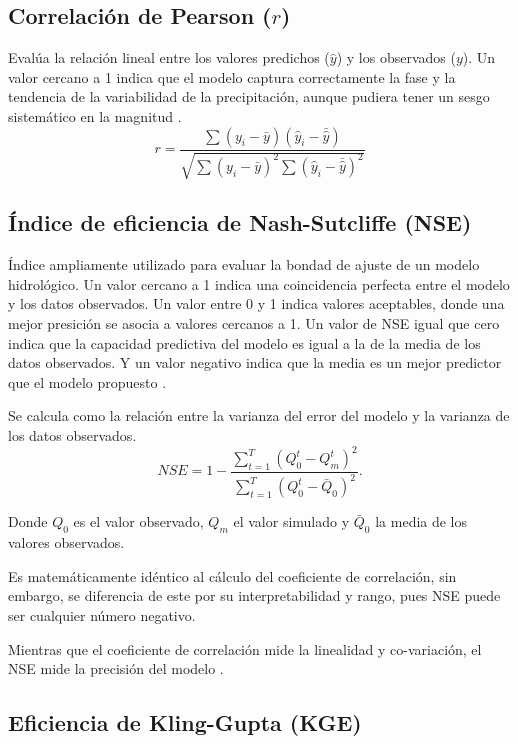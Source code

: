 \subsection{Correlación de Pearson (\(r\))}
Evalúa la relación lineal entre los valores predichos (\(\hat{y}\)) y los observados (\(y\)). Un valor cercano a 1 indica que el modelo captura correctamente la fase y la tendencia de la variabilidad de la precipitación, aunque pudiera tener un sesgo sistemático en la magnitud \citep{lalinde2018uso}.
\begin{equation}
    r = \frac{\sum (y_i - \bar{y})(\hat{y}_i - \bar{\hat{y}})}{\sqrt{\sum (y_i - \bar{y})^2 \sum (\hat{y}_i - \bar{\hat{y}})^2}}
\end{equation}

\subsection{Índice de eficiencia de Nash-Sutcliffe (NSE)}
Índice ampliamente utilizado para evaluar la bondad de ajuste de un modelo hidrológico. Un valor cercano a 1 indica una coincidencia perfecta entre el modelo y los datos observados. Un valor entre 0 y 1 indica valores aceptables, donde una mejor presición se asocia a valores cercanos a 1. Un valor de NSE igual que cero indica que la capacidad predictiva del modelo es igual a la de la media de los datos observados. Y un valor negativo indica que la media es un mejor predictor que el modelo propuesto \citep{RITTER201333}.

Se calcula como la relación entre la varianza del error del modelo y la varianza de los datos observados.
\begin{equation}
    NSE = 1 - \frac{\sum_{t=1}^T(Q_0^t-Q_m^t)^2}{\sum_{t=1}^T(Q_0^t-\bar{Q}_0)^2}.
\end{equation}

Donde $Q_0$ es el valor observado, $Q_m$ el valor simulado y $\bar{Q}_0$ la media de los valores observados. 

Es matemáticamente idéntico al cálculo del coeficiente de correlación, sin embargo, se diferencia de este por su interpretabilidad y rango, pues NSE puede ser cualquier número negativo. 

Mientras que el coeficiente de correlación mide la linealidad y co-variación, el NSE mide la precisión del modelo .

\subsection{Eficiencia de Kling-Gupta (KGE)}

